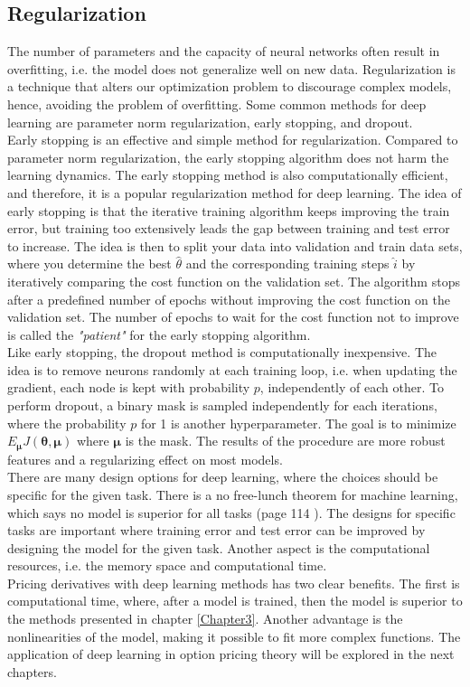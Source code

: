 \subsection{Regularization}\label{regularization}
The number of parameters and the capacity of neural networks often result in overfitting, i.e. the model does not generalize well on new data. Regularization is a technique that alters our optimization problem to discourage complex models, hence, avoiding the problem of overfitting. Some common methods for deep learning are parameter norm regularization, early stopping, and dropout.\\

Early stopping is an effective and simple method for regularization. Compared to parameter norm regularization, the early stopping algorithm does not harm the learning dynamics. The early stopping method is also computationally efficient, and therefore, it is a popular regularization method for deep learning. The idea of early stopping is that the iterative training algorithm keeps improving the train error, but training too extensively leads the gap between training and test error to increase. The idea is then to split your data into validation and train data sets, where you determine the best $\hat{\theta}$ and the corresponding training steps $\hat{i}$ by iteratively comparing the cost function on the validation set. The algorithm stops after a predefined number of epochs without improving the cost function on the validation set. The number of epochs to wait for the cost function not to improve is called the \textsl{"patient"} for the early stopping algorithm.\\

Like early stopping, the dropout method is computationally inexpensive. The idea is to remove neurons randomly at each training loop, i.e. when updating the gradient, each node is kept with probability $p$, independently of each other. To perform dropout, a binary mask is sampled independently for each iterations, where the probability $p$ for 1 is another hyperparameter. The goal is to minimize $E_{\bm{\mu}} J(\bm{\theta}, \bm{\mu})$ where $\bm{\mu}$ is the mask. The results of the procedure are more robust features and a regularizing effect on most models.\\

There are many design options for deep learning, where the choices should be specific for the given task. There is a no free-lunch theorem for machine learning, which says no model is superior for all tasks (page 114 \parencite{Goodfellow-et-al-2016}). The designs for specific tasks are important where training error and test error can be improved by designing the model for the given task. Another aspect is the computational resources, i.e. the memory space and computational time. \\

Pricing derivatives with deep learning methods has two clear benefits. The first is computational time, where, after a model is trained, then the model is superior to the methods presented in chapter \ref{Chapter3}. Another advantage is the nonlinearities of the model, making it possible to fit more complex functions. The application of deep learning in option pricing theory will be explored in the next chapters.
